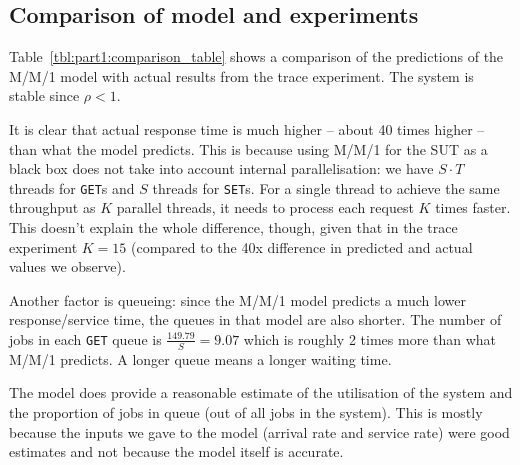 \documentclass[11pt]{article}
\newcommand{\get}[0]{\texttt{GET}}
\newcommand{\set}[0]{\texttt{SET}}
\newcommand{\linkmain}[1]{\href{https://gitlab.inf.ethz.ch/pungast/asl-fall16-project/blob/master/src/main/java/asl/#1.java}{#1}}
\begin{document}


\subsection{Comparison of model and experiments}




Table~\ref{tbl:part1:comparison_table} shows a comparison of the predictions of the M/M/1 model with actual results from the trace experiment. The system is stable since $\rho < 1$.

It is clear that actual response time is much higher -- about 40 times higher -- than what the model predicts. This is because using M/M/1 for the SUT as a black box does not take into account internal parallelisation: we have $S \cdot T$ threads for \get{}s and $S$ threads for \set{}s. For a single thread to achieve the same throughput as $K$ parallel threads, it needs to process each request $K$ times faster. This doesn't explain the whole difference, though, given that in the trace experiment $K=15$ (compared to the 40x difference in predicted and actual values we observe).

Another factor is queueing: since the M/M/1 model predicts a much lower response/service time, the queues in that model are also shorter. The number of jobs in each \get{} queue is $\frac{149.79}{S} = 9.07$ which is roughly 2 times more than what M/M/1 predicts. A longer queue means a longer waiting time.

The model does provide a reasonable estimate of the utilisation of the system and the proportion of jobs in queue (out of all jobs in the system). This is mostly because the inputs we gave to the model (arrival rate and service rate) were good estimates and not because the model itself is accurate.
\end{document}
